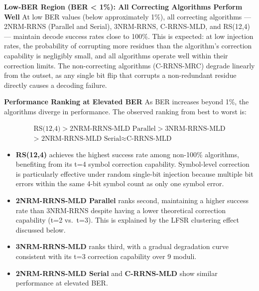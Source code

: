 \documentclass[
  english,
  12pt,
]{report}
\providecommand{\tightlist}{%
  \setlength{\itemsep}{0pt}\setlength{\parskip}{0pt}}
\begin{document}
\textbf{Low-BER Region (BER \textless{} 1\%): All Correcting Algorithms
Perform Well} At low BER values (below approximately 1\%), all
correcting algorithms --- 2NRM-RRNS (Parallel and Serial), 3NRM-RRNS,
C-RRNS-MLD, and RS(12,4) --- maintain decode success rates close to
100\%. This is expected: at low injection rates, the probability of
corrupting more residues than the algorithm's correction capability is
negligibly small, and all algorithms operate well within their
correction limits. The non-correcting algorithms (C-RRNS-MRC) degrade
linearly from the outset, as any single bit flip that corrupts a
non-redundant residue directly causes a decoding failure.

\textbf{Performance Ranking at Elevated BER} As BER increases beyond
1\%, the algorithms diverge in performance. The observed ranking from
best to worst is:

\[ \begin{aligned} \text{RS(12,4)} > \text{2NRM-RRNS-MLD Parallel} > \text{3NRM-RRNS-MLD}  \\ \text{> 2NRM-RRNS-MLD Serial} \approx \text{C-RRNS-MLD} \end{aligned} \]

\begin{itemize}
\tightlist
\item
  \textbf{RS(12,4)} achieves the highest success rate among non-100\%
  algorithms, benefiting from its t=4 symbol correction capability.
  Symbol-level correction is particularly effective under random
  single-bit injection because multiple bit errors within the same 4-bit
  symbol count as only one symbol error.
\item
  \textbf{2NRM-RRNS-MLD Parallel} ranks second, maintaining a higher
  success rate than 3NRM-RRNS despite having a lower theoretical
  correction capability (t=2 vs.~t=3). This is explained by the LFSR
  clustering effect discussed below.
\item
  \textbf{3NRM-RRNS-MLD} ranks third, with a gradual degradation curve
  consistent with its t=3 correction capability over 9 moduli.
\item
  \textbf{2NRM-RRNS-MLD Serial} and \textbf{C-RRNS-MLD} show similar
  performance at elevated BER.
\end{itemize}
\end{document}
